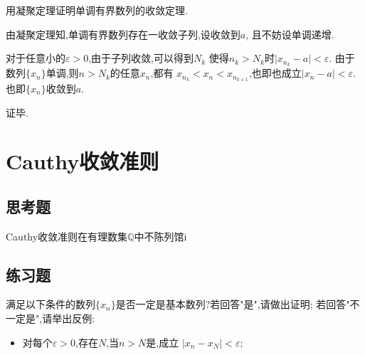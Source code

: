 \documentclass[cn]{elegantbook}
\begin{document}
            \begin{exercise}
                用凝聚定理证明单调有界数列的收敛定理.
            \end{exercise}
            \begin{solution}
                由凝聚定理知,单调有界数列存在一收敛子列,设收敛到$a$,
                且不妨设单调递增.

                对于任意小的$\varepsilon>0$,由于子列收敛,可以得到$N_k$
                使得$n_k>N_k$时$\lvert x_{n_k}-a\rvert<\varepsilon$.
                由于数列$\{x_n\}$单调,则$n>N_k$的任意$x_n$,都有
                $x_{n_k}<x_n<x_{n_{k+1}}$,也即也成立$\lvert x_n-a\rvert<\varepsilon$.
                也即$\{x_n\}$收敛到$a$.

                证毕.
            \end{solution}
    
    \section{Cauthy收敛准则}
        \subsection{思考题}
            \begin{exercise}
                Cauthy收敛准则在有理数集$\mathbb{Q}$中不陈列馆i
            \end{exercise}
            \begin{solution}
                
            \end{solution}
        
            \subsection{练习题}
            \begin{exercise}
                满足以下条件的数列$\{x_n\}$是否一定是基本数列?若回答"是",请做出证明;
                若回答"不一定是",请举出反例:
                \begin{itemize}
                    \item 对每个$\varepsilon>0$,存在$N$,当$n>N$是,成立
                    $\lvert x_n-x_N\rvert<\varepsilon$;
                \end{itemize}
            \end{exercise}
\end{document}
